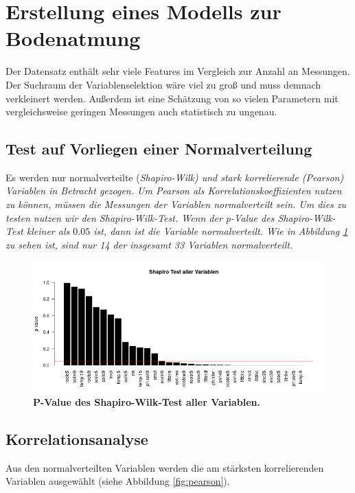 \section{Erstellung eines Modells zur Bodenatmung}
\label{sec-model}

Der Datensatz enthält sehr viele Features im Vergleich zur Anzahl an Messungen.
Der Suchraum der Variablenselektion wäre viel zu groß und muss demnach verkleinert werden.
Außerdem ist eine Schätzung von so vielen Parametern mit vergleichsweise geringen Messungen auch statistisch zu ungenau.

\subsection{Test auf Vorliegen einer Normalverteilung}

Es werden nur normalverteilte (\it{Shapiro-Wilk}) und stark korrelierende (\it{Pearson}) Variablen in Betracht gezogen. Um \it{Pearson} als Korrelationskoeffizienten nutzen zu können, müssen die Messungen der Variablen normalverteilt sein. Um dies zu testen nutzen wir den \it{Shapiro-Wilk-Test}. Wenn der \it{p-Value} des \it{Shapiro-Wilk-Test} kleiner als $0.05$ ist, dann ist die Variable normalverteilt. Wie in Abbildung \ref{fig:shapiro} zu sehen ist, sind nur 14 der insgesamt 33 Variablen normalverteilt.

\begin{figure}[ht]
	\centering
	\includegraphics[width=\textwidth]{fig/model/normalverteilung-shapiro.png}
	\caption{\bf{P-Value des Shapiro-Wilk-Test aller Variablen.}}
	\label{fig:shapiro}
\end{figure}

\subsection{Korrelationsanalyse}

Aus den normalverteilten Variablen werden die am stärksten korrelierenden Variablen ausgewählt (siehe Abbildung \ref{fig:pearson}). 

